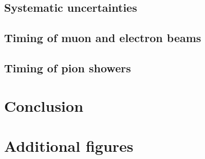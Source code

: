 \subsection{Systematic uncertainties}

\subsection{Timing of muon and electron beams}

\subsection{Timing of pion showers}

\section{Conclusion}



\section{Additional figures}
